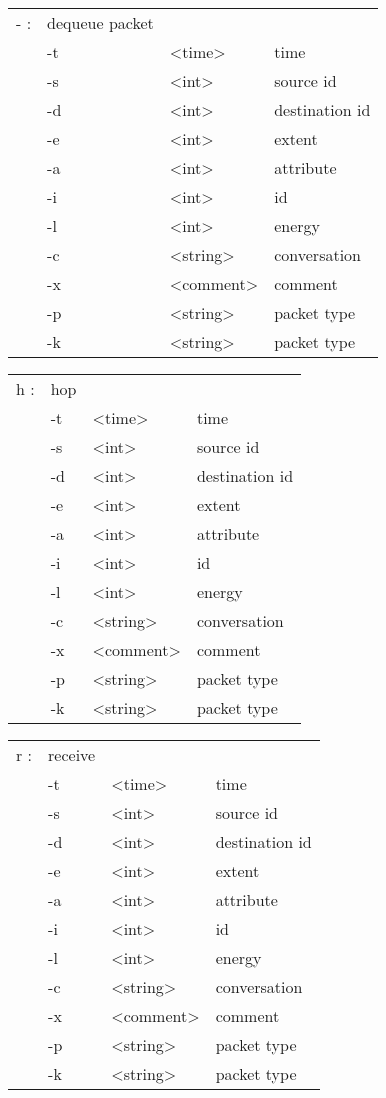   \begin{tabular}{llll}
  - : & dequeue packet & & \\
    &  -t & <time> & time \\
    &  -s & <int> & source id \\
    &  -d & <int> & destination id \\
    &  -e & <int> & extent \\
    &  -a & <int> & attribute \\
    &  -i & <int> & id \\
    &  -l & <int> & energy \\
    &  -c & <string> & conversation \\
    &  -x & <comment> & comment \\
    &  -p & <string> & packet type \\
    &  -k & <string> & packet type \\
  \end{tabular}

  \begin{tabular}{llll}
  h : & hop & & \\
    &  -t & <time> & time \\
    &  -s & <int> & source id \\
    &  -d & <int> & destination id \\
    &  -e & <int> & extent \\
    &  -a & <int> & attribute \\
    &  -i & <int> & id \\
    &  -l & <int> & energy \\
    &  -c & <string> & conversation \\
    &  -x & <comment> & comment \\
    &  -p & <string> & packet type \\
    &  -k & <string> & packet type \\
  \end{tabular}

  \begin{tabular}{llll}
  r : & receive & & \\
    &  -t & <time> & time \\
    &  -s & <int> & source id \\
    &  -d & <int> & destination id \\
    &  -e & <int> & extent \\
    &  -a & <int> & attribute \\
    &  -i & <int> & id \\
    &  -l & <int> & energy \\
    &  -c & <string> & conversation \\
    &  -x & <comment> & comment \\
    &  -p & <string> & packet type \\
    &  -k & <string> & packet type \\
  \end{tabular}

